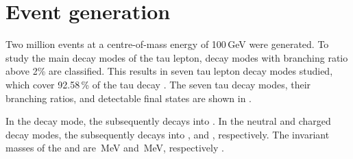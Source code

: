 




\section{Event generation}
\label{sec:tauDecayModes}


Two million \eeToTauTau events at a centre-of-mass energy of 100\,GeV were generated. To study the main decay modes of the tau lepton, decay modes with branching ratio above 2\% are classified. This results in seven tau lepton decay modes studied, which cover 92.58\,\% of the tau decay \cite{Agashe:2014kda}. The seven tau decay modes, their branching ratios, and detectable final states are  shown in .


In the  \decayRho decay mode, the \Prho subsequently decays into  \decayRhoFinalStateShort. In the \decayAi neutral and charged decay modes, the \Pai  subsequently decays into \decayAiPhotonFinalStateShort, and \decayAiPionFinalStateShort, respectively. The invariant masses of the \Prho and \Pai are \,MeV and \,MeV, respectively \cite{Agashe:2014kda}.

